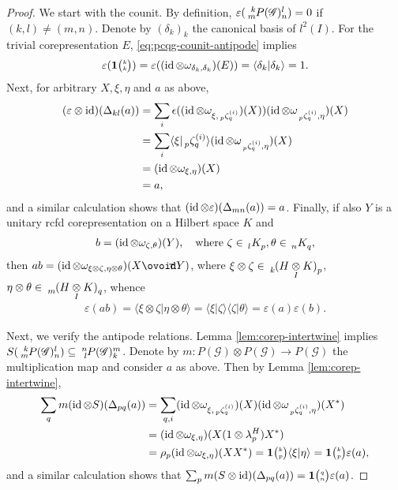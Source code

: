 \begin{proof}
  We start with the counit.  By definition, $\varepsilon(\Gr{P(\mathscr{G})}{k}{l}{m}{n})=0$ if $(k,l)\neq
  (m,n)$.  Denote by $(\delta_{k})_{k}$ the canonical basis of $l^{2}(I)$. For the trivial
  corepresentation $E$, \eqref{eq:pcqg-counit-antipode} implies
  \begin{align*}
    \varepsilon(\mathbf{1}{\tiny {\begin{pmatrix} k\\k\end{pmatrix}}}) = \varepsilon((\operatorname{id} \otimes \omega_{\delta_{k},\delta_{k}})(E)) =
    \langle \delta_{k}|\delta_{k}\rangle = 1.
  \end{align*}
Next,   for arbitrary $X,\xi,\eta$ and $a$ as above,
\begin{align*}
    (\varepsilon \otimes\id)(\Delta_{kl}(a)) &= \sum_{i}\epsilon((\id \otimes
    \omega_{\xi,\Gr{\zeta}{}{(i)}{p}{q}})(X)) (\id \otimes \omega_{\Gr{\zeta}{}{(i)}{p}{q},\eta})(X)
    \\
    &= \sum_{i}\langle \xi|\Gr{\zeta}{}{(i)}{p}{q}\rangle(\id \otimes
    \omega_{\Gr{\zeta}{}{(i)}{p}{q},\eta})(X) \\ &= (\id \otimes \omega_{\xi,\eta})(X) \\ &= a,
  \end{align*}
  and a similar calculation shows that  $    (\operatorname{id} \otimes \varepsilon)(\Delta_{mn}(a))=a$.
Finally, if also $Y$ is a unitary rcfd corepresentation on a Hilbert space $K$ and
\begin{align*}
  b=(\id \otimes \omega_{\zeta,\theta})(Y), \quad \text{where } \zeta \in \Grd{K}{l}{p}, \theta \in \Grd{K}{n}{q},
\end{align*}
then $ab = (\id \otimes \omega_{\xi\otimes \zeta,\eta\otimes \theta})(X\Circt Y)$, where $\xi\otimes \zeta \in \Grd{(H\itimes K)}{k}{p}$, $\eta\otimes \theta \in \Grd{(H\itimes
  K)}{m}{q}$, whence
\begin{align*}
  \varepsilon(ab) = \langle \xi\otimes \zeta|\eta\otimes \theta\rangle = \langle
  \xi|\zeta\rangle\langle \zeta|\theta\rangle = \varepsilon(a)\varepsilon(b).
\end{align*}

Next, we verify the antipode relations. 
Lemma \ref{lem:corep-intertwine} implies $S(\Gr{P(\mathscr{G})}{k}{l}{m}{n}) \subseteq \Gr{P(\mathscr{G})}{n}{m}{l}{k}$.
Denote by $m \colon P(\mathscr{G})\otimes P(\mathscr{G})\to P(\mathscr{G})$ the multiplication
map and consider $a$ as above. Then by Lemma \ref{lem:corep-intertwine},
\begin{align*}
  \sum_{q} m(\id \otimes S)(\Delta_{pq}(a)) &= 
  \sum_{q,i} (\id \otimes \omega_{\xi,\Gr{\zeta}{}{(i)}{p}{q}})(X)  (\id \otimes
  \omega_{\Gr{\zeta}{}{(i)}{p}{q},\eta})(X^{*}) \\ &=
 (\id \otimes \omega_{\xi,\eta})(X(1\otimes \lambda^{H}_{p})X^{*})  \\
  &= \rho_{p}  (\id \otimes \omega_{\xi,\eta})(XX^{*})  = \UnitC{k}{p}\langle \xi|\eta\rangle =\UnitC{k}{p} \varepsilon(a),
\end{align*}
and a similar calculation shows that $\sum_{p} m(S \otimes \operatorname{id})(\Delta_{pq}(a)) = \mathbf{1}{\tiny {\begin{pmatrix} q\\n\end{pmatrix}}}\varepsilon(a)$.


\end{proof}
